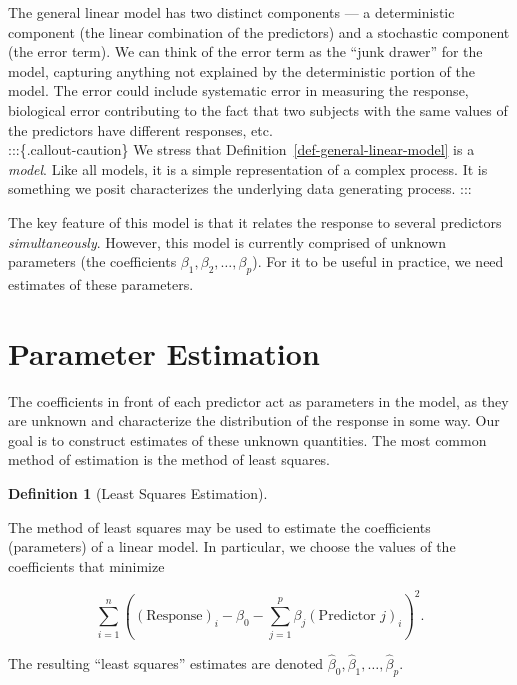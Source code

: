 \documentclass[
  letterpaper,
  DIV=11,
  numbers=noendperiod]{scrreprt}
\theoremstyle{definition}
\theoremstyle{definition}
\newtheorem{definition}{Definition}[chapter]
\theoremstyle{remark}
\begin{document}
The general linear model has two distinct components --- a deterministic
component (the linear combination of the predictors) and a stochastic
component (the error term). We can think of the error term as the ``junk
drawer'' for the model, capturing anything not explained by the
deterministic portion of the model. The error could include systematic
error in measuring the response, biological error contributing to the
fact that two subjects with the same values of the predictors have
different responses, etc.\\
:::\{.callout-caution\} We stress that
Definition~\ref{def-general-linear-model} is a \emph{model}. Like all
models, it is a simple representation of a complex process. It is
something we posit characterizes the underlying data generating process.
:::

The key feature of this model is that it relates the response to several
predictors \emph{simultaneously}. However, this model is currently
comprised of unknown parameters (the coefficients
\(\beta_1, \beta_2, \dotsc, \beta_p\)). For it to be useful in practice,
we need estimates of these parameters.

\hypertarget{parameter-estimation}{%
\section{Parameter Estimation}\label{parameter-estimation}}

The coefficients in front of each predictor act as parameters in the
model, as they are unknown and characterize the distribution of the
response in some way. Our goal is to construct estimates of these
unknown quantities. The most common method of estimation is the method
of least squares.

\begin{definition}[Least Squares
Estimation]\protect\hypertarget{def-least-squares}{}\label{def-least-squares}

The method of least squares may be used to estimate the coefficients
(parameters) of a linear model. In particular, we choose the values of
the coefficients that minimize

\[\sum\limits_{i=1}^{n} \left((\text{Response})_i - \beta_0 - \sum\limits_{j=1}^{p} \beta_j (\text{Predictor } j)_{i}\right)^2.\]

The resulting ``least squares'' estimates are denoted
\(\widehat{\beta}_0, \widehat{\beta}_1, \dotsc, \widehat{\beta}_p\).

\end{definition}
\end{document}
